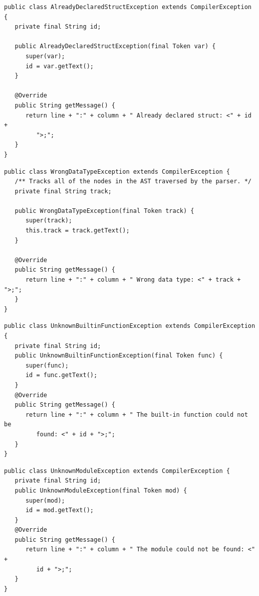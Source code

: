 \begin{lstlisting}[frame=htrbl, caption={Implementation of {\ttfamily AlreadyDeclaredStructException.java}}, label={lst:already_declared_struct_exception}, basicstyle=\footnotesize]
public class AlreadyDeclaredStructException extends CompilerException {
   private final String id;

   public AlreadyDeclaredStructException(final Token var) {
      super(var);
      id = var.getText();
   }

   @Override
   public String getMessage() {
      return line + ":" + column + " Already declared struct: <" + id + 
         ">;";
   }
}
\end{lstlisting}

\begin{lstlisting}[frame=htrbl, caption={Implementation of {\ttfamily WrongDataTypeException.java}}, label={lst:wrong_data_type_exception}, basicstyle=\footnotesize]
public class WrongDataTypeException extends CompilerException {
   /** Tracks all of the nodes in the AST traversed by the parser. */
   private final String track;

   public WrongDataTypeException(final Token track) {
      super(track);
      this.track = track.getText();
   }

   @Override
   public String getMessage() {
      return line + ":" + column + " Wrong data type: <" + track + ">;";
   }
}
\end{lstlisting}

\begin{lstlisting}[frame=htrbl, caption={Implementation of {\ttfamily UnknownBuiltinFunctionException.java}}, label={lst:unknown_builtin_function_exception}, basicstyle=\footnotesize]
public class UnknownBuiltinFunctionException extends CompilerException {
   private final String id;
   public UnknownBuiltinFunctionException(final Token func) {
      super(func);
      id = func.getText();
   }
   @Override
   public String getMessage() {
      return line + ":" + column + " The built-in function could not be 
         found: <" + id + ">;";
   }
}
\end{lstlisting}

\begin{lstlisting}[frame=htrbl, caption={Implementation of {\ttfamily UnknownModuleException.java}}, label={lst:unknown_module_exception}, basicstyle=\footnotesize]
public class UnknownModuleException extends CompilerException {
   private final String id;
   public UnknownModuleException(final Token mod) {
      super(mod);
      id = mod.getText();
   }
   @Override
   public String getMessage() {
      return line + ":" + column + " The module could not be found: <" + 
         id + ">;";
   }
}
\end{lstlisting}

